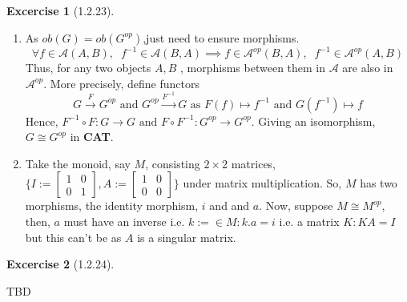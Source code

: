 \documentclass{article}
\theoremstyle{definition}
\newtheorem*{excercise}{Excercise}
\begin{document}
\begin{excercise}[1.2.23] %
	\begin{enumerate}[label=(\alph*)]
		\item As $ob(G)=ob(G^{op})$,just need to ensure morphisms.
			\[\forall f \in \mathcal{A}(A,B) ,\; \; f^{-1} \in \mathcal{A}(B,A) \implies
			f \in \mathcal{A}^{op}(B,A) ,\; \; f^{-1} \in \mathcal{A}^{op}(A,B) \]
			Thus, for any two objects $A,B$ , morphisms between them in $\mathcal{A} $
			are also in $\mathcal{A} ^{op}$. More precisely, define functors
			\[ G \xrightarrow{F} G^{op} \text{ and } G^{op} \xrightarrow{F^{-1}} G \text{ as }
			F(f)\mapsto f^{-1} \text{ and } G(f^{-1}) \mapsto f \]
			Hence, $ F^{-1} \circ F : G \rightarrow G \text{ and } F \circ  F^{-1} : G^{op} \rightarrow G^{op}$.
			Giving an isomorphism, $G\cong G^{op}$  in \textbf{CAT}.
		\item Take the monoid, say $M$, consisting $2\times2$ matrices, $\Bigg\{
				I:=\begin{bmatrix}
					1 & 0 \\
					0 & 1
				\end{bmatrix},
				A:=\begin{bmatrix}
					1 & 0 \\
					0 & 0
			\end{bmatrix}\Bigg\}$ under matrix multiplication.
			So, $M$ has two morphisms, the identity morphism, $i$ and and $a$.
			Now, suppose $M \cong M^{op} $, then, $a$ must have an inverse i.e.
			$ k:= \in M : k.a=i $ i.e. a matrix $K: KA = I$ but this can't be as $A$ is a singular matrix.
	\end{enumerate}
\end{excercise}
\begin{excercise}[1.2.24] %

\end{excercise}

\pagebreak
TBD
\end{document}
